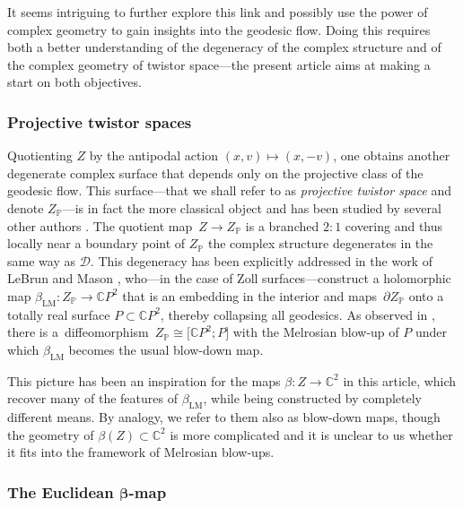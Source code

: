 \documentclass[pdftex]{sigma}
\numberwithin{equation}{section}
\theoremstyle{definition}
\newcommand{\C}{\mathbb{C}} %
\newcommand{\1}{{\bf 1}}
\newcommand{\D}{\mathscr{D}}
\begin{document}
 It seems intriguing to further explore this link and possibly
use the power of complex geometry to gain insights into the geodesic flow. Doing this requires both a better understanding of the degeneracy of the complex structure and of the complex geometry of twistor space---the present article aims at making a start on both objectives.


\subsubsection{Projective twistor spaces} Quotienting $Z$ by the antipodal action $(x,v)\mapsto (x,-v)$, one obtains another degenerate complex surface that depends only on the projective class of the geodesic flow. This surface---that we shall refer to as {\it projective twistor space} and denote $Z_\mathbb P$---is in fact the more classical object and has been studied by several other authors \cite{Dub83,Hit80,Leb80,LeMa02,LM10,Met21,MePa20,OR85}. The quotient map~${Z\rightarrow Z_\mathbb P}$
is a branched $2:1$ covering and thus locally near a boundary point of $Z_\mathbb P$ the complex structure degenerates in the same way as $\D$. This degeneracy has been explicitly addressed in the work of LeBrun and Mason \cite{LeMa02,LM10}, who---in the case of Zoll surfaces---construct a holomorphic map $\beta_{\mathrm{LM}}\colon Z_\mathbb P\rightarrow \C P^2$ that is an embedding in the interior and maps~$\partial Z_\mathbb P$ onto a totally real surface $P\subset\C P^2$, thereby collapsing all geodesics. As observed in \cite{Roc11}, there is a~diffeomorphism~${Z_\mathbb P \cong \big[\C P^2;P\big]}$ with the Melrosian blow-up of $P$ under which $\beta_{\mathrm{LM}}$ becomes the usual blow-down map.

This picture has been an inspiration for the maps $\beta\colon Z\to \C^2$ in this article, which recover many of the features of $\beta_{\mathrm{LM}}$, while being constructed by completely different means. By analogy, we refer to them also as blow-down maps, though the geometry of $\beta(Z)\subset \C^2$ is more complicated and it is unclear to us whether it fits into the framework of Melrosian blow-ups.

\subsubsection[The Euclidean beta-map]{The Euclidean $\boldsymbol{\beta}$-map}\label{sec_Eucl}
\end{document}
